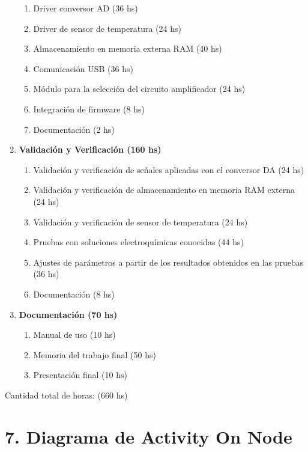\documentclass[11pt]{charter}
\begin{document}
\begin{enumerate}
\begin{enumerate}
		\item Driver conversor AD (36 hs)
		\item Driver de sensor de temperatura (24 hs)
		\item Almacenamiento en memoria externa RAM (40 hs)
		\item Comunicación USB (36 hs)
		\item Módulo para la selección del circuito amplificador (24 hs)	
		\item Integración de firmware (8 hs)
		\item Documentación (2 hs)
	\end{enumerate}		
\item \textbf{Validación y Verificación (160 hs)}
	\begin{enumerate}
		\item Validación y verificación de señales aplicadas con el conversor DA (24 hs)
		\item Validación y verificación de almacenamiento en memoria RAM externa (24 hs)
		\item Validación y verificación de sensor de temperatura (24 hs)
		\item Pruebas con soluciones electroquímicas conocidas (44 hs)
		\item Ajustes de parámetros a partir de los resultados obtenidos en las pruebas (36 hs)
		\item Documentación (8 hs)
	\end{enumerate}
\item \textbf{Documentación (70 hs)}
	\begin{enumerate}
		\item Manual de uso (10 hs)
		\item Memoria del trabajo final (50 hs)
		\item Presentación final (10 hs)
	\end{enumerate}
\end{enumerate}

Cantidad total de horas: (660 hs)


\section{7. Diagrama de Activity On Node}
\label{sec:AoN}
\end{document}
